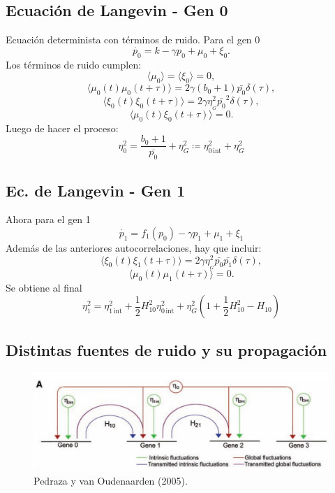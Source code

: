 \documentclass[xcolor=dvipsnames]{beamer}
\begin{document}
\subsection{Ecuaci\'on de Langevin - Gen 0}
\begin{frame}
Ecuaci\'on determinista con t\'erminos de ruido. Para el gen 0
$$\dot{p_0} = k - \gamma p_0 + \mu_0 + \xi_{0}.$$
Los t\'erminos de ruido cumplen:
$$\langle \mu_0 \rangle = \langle \xi_0 \rangle = 0,$$
$$\langle \mu_0(t)\mu_0(t+\tau) \rangle  = 2\gamma (b_0+1) \bar{p_0} \delta(\tau),$$
$$\langle \xi_0(t)\xi_0(t+\tau) \rangle = 2 \gamma \eta_{_G}^2\bar{p_0}^2 \delta(\tau),$$
$$\langle \mu_0(t)\xi_0(t+\tau) \rangle = 0.$$
Luego de hacer el proceso:
$$\eta_0^2=\frac{b_0+1}{\bar{p_0}} + \eta_{G}^2\coloneqq\eta_{0\,\text{int}}^2+\eta_{G}^2$$
\end{frame}

\subsection{Ec. de Langevin - Gen 1}
\begin{frame}
Ahora para el gen 1
$$\dot{p_1} = f_1(p_{0}) - \gamma p_1 + \mu_1 + \xi_1$$
Adem\'as de las anteriores autocorrelaciones, hay que incluir:
$$\langle \xi_0(t)\xi_1(t+\tau) \rangle = 2 \gamma \eta_{_G}^2\bar{p_0}\bar{p_1}\delta(\tau),$$
$$\langle \mu_0(t)\mu_1(t+\tau) \rangle =0.$$
Se obtiene al final
$$\eta_1^2 = \eta_{1\,\text{int}}^2 + \frac{1}{2} H_{10}^2 \eta_{0\,\text{int}}^2 + \eta_G^2\left( 1 + \frac{1}{2} H_{10}^2 - H_{10} \right)$$
\end{frame}

\subsection{Distintas fuentes de ruido y su propagaci\'on}
\begin{frame}
\begin{figure}[p]
    \centering
    \includegraphics[width=\textwidth]{globalint.png}\\
    \tiny Pedraza y van Oudenaarden (2005).
\end{figure}
\end{frame}
\end{document}
